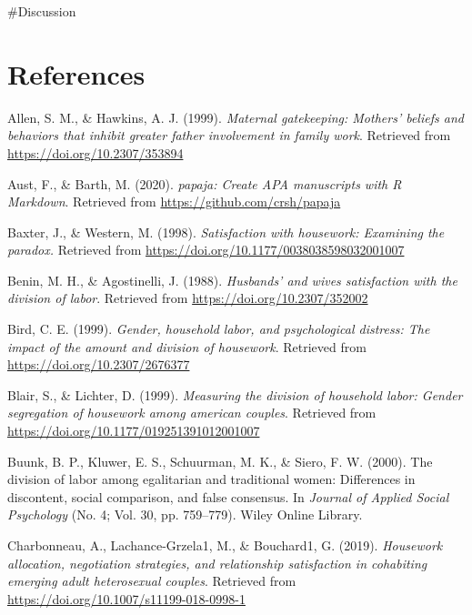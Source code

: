 \documentclass[
  man,floatsintext]{apa6}
\newlength{\cslhangindent}
\newlength{\cslentryspacingunit} %
\newenvironment{CSLReferences}[2] %
 {%
  \setlength{\parindent}{0pt}
  \ifodd #1
  \let\oldpar\par
  \def\par{\hangindent=\cslhangindent\oldpar}
  \fi
  \setlength{\parskip}{#2\cslentryspacingunit}
 }%
 {}
\begin{document}
\#Discussion

\newpage

\hypertarget{references}{%
\section{References}\label{references}}

\hypertarget{refs}{}
\begin{CSLReferences}{1}{0}
\leavevmode{}%
Allen, S. M., \& Hawkins, A. J. (1999). \emph{Maternal gatekeeping: Mothers' beliefs and behaviors that inhibit greater father involvement in family work}. Retrieved from \url{https://doi.org/10.2307/353894}

\leavevmode{}%
Aust, F., \& Barth, M. (2020). \emph{{papaja}: {Create} {APA} manuscripts with {R Markdown}}. Retrieved from \url{https://github.com/crsh/papaja}

\leavevmode{}%
Baxter, J., \& Western, M. (1998). \emph{Satisfaction with housework: Examining the paradox.} Retrieved from \url{https://doi.org/10.1177/0038038598032001007}

\leavevmode{}%
Benin, M. H., \& Agostinelli, J. (1988). \emph{Husbands' and wives satisfaction with the division of labor}. Retrieved from \url{https://doi.org/10.2307/352002}

\leavevmode{}%
Bird, C. E. (1999). \emph{Gender, household labor, and psychological distress: The impact of the amount and division of housework}. Retrieved from \url{https://doi.org/10.2307/2676377}

\leavevmode{}%
Blair, S., \& Lichter, D. (1999). \emph{Measuring the division of household labor: Gender segregation of housework among american couples}. Retrieved from \url{https://doi.org/10.1177/019251391012001007}

\leavevmode{}%
Buunk, B. P., Kluwer, E. S., Schuurman, M. K., \& Siero, F. W. (2000). The division of labor among egalitarian and traditional women: Differences in discontent, social comparison, and false consensus. In \emph{Journal of Applied Social Psychology} (No. 4; Vol. 30, pp. 759--779). Wiley Online Library.

\leavevmode{}%
Charbonneau, A., Lachance-Grzela1, M., \& Bouchard1, G. (2019). \emph{Housework allocation, negotiation strategies, and relationship satisfaction in cohabiting emerging adult heterosexual couples}. Retrieved from \url{https://doi.org/10.1007/s11199-018-0998-1}


\end{CSLReferences}
\end{document}
